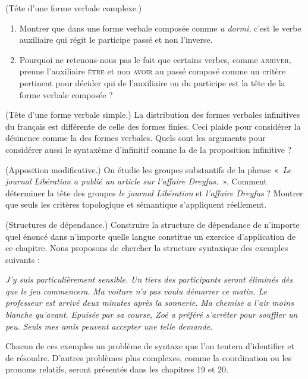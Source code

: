 {     (Tête d'une forme verbale complexe.)
    \begin{enumerate}[label=\alph*.]
    \item Montrer que dans une forme verbale composée comme \textit{a dormi}, c’est le verbe auxiliaire qui régit le participe passé et non l’inverse.
    \item Pourquoi ne retenons-nous pas le fait que certains verbes, comme \textsc{arriver}, prenne l’auxiliaire \textsc{être} et non \textsc{avoir} au passé composé comme un critère pertinent pour décider qui de l’auxiliaire ou du participe est la tête de la forme verbale composée ?
    \end{enumerate}

     (Tête d'une forme verbale simple.) La distribution des formes verbales infinitives du français est différente de celle des formes finies. Ceci plaide pour considérer la désinence comme la  des formes verbales. Quels sont les arguments pour considérer aussi le syntaxème d’infinitif comme la  de la proposition infinitive ?

     (Apposition modificative.) On étudie les groupes substantifs de la phrase «~\textit{Le journal Libération a publié un article sur l’affaire Dreyfus.}~». Comment déterminer la tête des groupes \textit{le journal Libération} et \textit{l’affaire Dreyfus} ? Montrer que seuls les critères topologique et sémantique s’appliquent réellement.

 
     (Structures de dépendance.) Construire la structure de dépendance de n’importe quel énoncé dans n’importe quelle langue constitue un exercice d’application de ce chapitre. Nous proposons de chercher la structure syntaxique des exemples suivants :

    \begin{exe}
          \textit{J’y suis particulièrement sensible.}
          \textit{Un tiers des participants seront éliminés dès que le jeu commencera.}
          \textit{Ma voiture n’a pas voulu démarrer ce matin.}
          \textit{Le professeur est arrivé deux minutes après la sonnerie.}
          \textit{Ma chemise a l’air moins blanche qu’avant.}
          \textit{Epuisée par sa course, Zoé a préféré s’arrêter pour souffler un peu.}
          \textit{Seuls mes amis peuvent accepter une telle demande.}
    \end{exe}
    Chacun de ces exemples un problème de syntaxe que l’on tentera d’identifier et de résoudre. D’autres problèmes plus complexes, comme la coordination ou les pronoms relatifs, seront présentés dans les chapitres 19 et 20.

}
